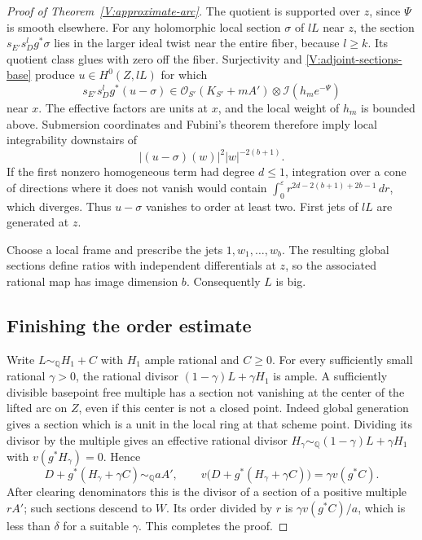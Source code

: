 \begin{proof}[Proof of Theorem~\ref{V:approximate-arc}]
The quotient is supported over $z$, since $\Psi$ is smooth elsewhere.
For any holomorphic local section $\sigma$ of $lL$ near $z$, the
section $s_{E'}s_D^l g^*\sigma$ lies in the larger ideal twist near
the entire fiber, because $l\ge k$.  Its quotient class glues with
zero off the fiber.  Surjectivity and
\eqref{V:adjoint-sections-base} produce $u\in H^0(Z,lL)$ for which
\[
 s_{E'}s_D^l g^*(u-\sigma)
\in \mathcal O_{S'}(K_{S'}+mA')\otimes\mathcal I(h_me^{-\Psi})
\]
near $x$.  The effective factors are units at $x$, and the local weight
of $h_m$ is bounded above.  Submersion coordinates and Fubini's
theorem therefore imply local integrability downstairs of
\[
 |(u-\sigma)(w)|^2|w|^{-2(b+1)}.
\]
If the first nonzero homogeneous term had degree $d\le1$, integration
over a cone of directions where it does not vanish would contain
$\int_0^\varepsilon r^{2d-2(b+1)+2b-1}\,dr$, which diverges.
Thus $u-\sigma$ vanishes to order at least two.  First jets of $lL$
are generated at $z$.

Choose a local frame and prescribe the jets $1,w_1,\ldots,w_b$.
The resulting global sections define ratios with independent
differentials at $z$, so the associated rational map has image
dimension $b$.  Consequently $L$ is big.

\subsection*{Finishing the order estimate}

Write $L\sim_{\mathbb Q}H_1+C$ with $H_1$ ample rational and $C\ge0$.
For every sufficiently small rational $\gamma>0$, the rational divisor
$(1-\gamma)L+\gamma H_1$ is ample.  A sufficiently divisible basepoint
free multiple has a section not vanishing at the center of the lifted
arc on $Z$, even if this center is not a closed point.  Indeed global
generation gives a section which is a unit in the local ring at that
scheme point.  Dividing its divisor by the multiple gives an effective
rational divisor $H_\gamma\sim_{\mathbb Q}(1-\gamma)L+\gamma H_1$
with $v(g^*H_\gamma)=0$.  Hence
\[
 D+g^*(H_\gamma+\gamma C)\sim_{\mathbb Q}aA',
 \qquad v\bigl(D+g^*(H_\gamma+\gamma C)\bigr)
       =\gamma v(g^*C).
\]
After clearing denominators this is the divisor of a section of a
positive multiple $rA'$; such sections descend to $W$.
Its order divided by $r$ is $\gamma v(g^*C)/a$, which is less than
$\delta$ for a suitable $\gamma$.  This completes the proof.
\end{proof}
